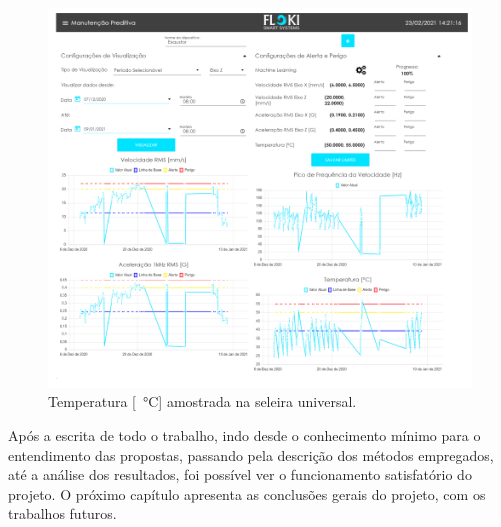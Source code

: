 \begin{figure}[H]
    \caption{Temperatura [\SI{}{\celsius}] amostrada na seleira universal.}
    \begin{center}
        \includegraphics[scale=0.8, page=6]{resultados/img/resultados.pdf}
    \end{center}
    \label{fig:seleira_universal_temperatura}
\end{figure}

Após a escrita de todo o trabalho, indo desde o conhecimento mínimo para o entendimento das propostas, passando pela descrição dos métodos
empregados, até a análise dos resultados, foi possível ver o funcionamento satisfatório do projeto. O próximo capítulo apresenta as conclusões
gerais do projeto, com os trabalhos futuros.
